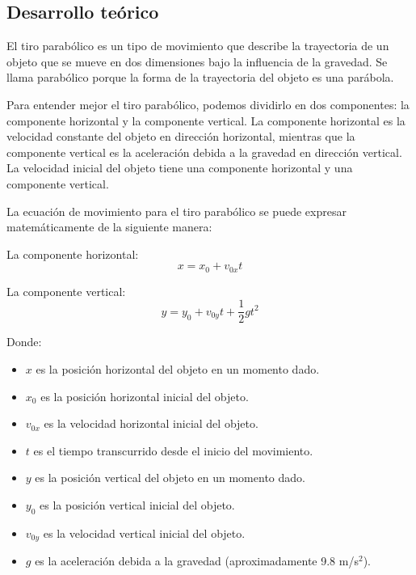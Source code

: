 \documentclass{article}
\begin{document}

\begin{multicols}{2}

\section{Desarrollo teórico}\label{Desarrollo Teorico}                              	%

El tiro parabólico es un tipo de movimiento que describe la trayectoria de un objeto que se mueve en dos dimensiones bajo la influencia de la gravedad. Se llama parabólico porque la forma de la trayectoria del objeto es una parábola.

Para entender mejor el tiro parabólico, podemos dividirlo en dos componentes: la componente horizontal y la componente vertical. La componente horizontal es la velocidad constante del objeto en dirección horizontal, mientras que la componente vertical es la aceleración debida a la gravedad en dirección vertical. La velocidad inicial del objeto tiene una componente horizontal y una componente vertical.

La ecuación de movimiento para el tiro parabólico se puede expresar matemáticamente de la siguiente manera:

La componente horizontal:
\begin{equation}
x = x_0 + v_{0x} t
\end{equation}

La componente vertical:
\begin{equation}
y = y_0 + v_{0y} t + \frac{1}{2} g t^2
\end{equation}

Donde:
\begin{itemize}
\item $x$ es la posición horizontal del objeto en un momento dado.
\item $x_0$ es la posición horizontal inicial del objeto.
\item $v_{0x}$ es la velocidad horizontal inicial del objeto.
\item $t$ es el tiempo transcurrido desde el inicio del movimiento.
\item $y$ es la posición vertical del objeto en un momento dado.
\item $y_0$ es la posición vertical inicial del objeto.
\item $v_{0y}$ es la velocidad vertical inicial del objeto.
\item $g$ es la aceleración debida a la gravedad (aproximadamente 9.8 m/s$^2$).
\end{itemize}


\end{multicols}
\end{document}
